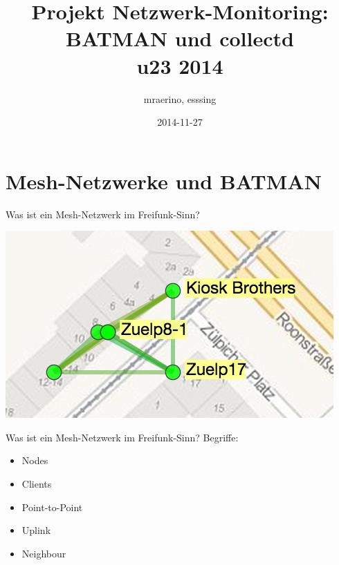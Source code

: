 \documentclass[ngerman,compress,aspectratio=169]{beamer}
\title[Projekt Netzwerk-Monitoring - u23 2014]
{\textbf{Projekt Netzwerk-Monitoring: \\ BATMAN und collectd} \\u23 2014}
\author[mraerino, esssing]
{mraerino, esssing}
\institute[Chaos Computer Club Cologne]
{
Chaos Computer Club Cologne e.V.\\
\url{https://koeln.ccc.de}
}
\date{2014-11-27}
\begin{document}
\begin{frame}
	\titlepage
\end{frame}

\begin{frame}
	\tableofcontents
\end{frame}

\section{Mesh-Netzwerke und BATMAN} 

\begin{frame}{Was ist ein Mesh-Netzwerk im Freifunk-Sinn?}
	\begin{center}
		\includegraphics[scale=1]{mesh-network-1}
	\end{center}
\end{frame}

\begin{frame}{Was ist ein Mesh-Netzwerk im Freifunk-Sinn?}
	Begriffe:
	\begin{itemize}
		\pause
		\item Nodes
		\pause
		\item Clients
		\pause
		\item Point-to-Point
		\pause
		\item Uplink
		\pause
		\item Neighbour
	\end{itemize}
\end{frame}
\end{document}
